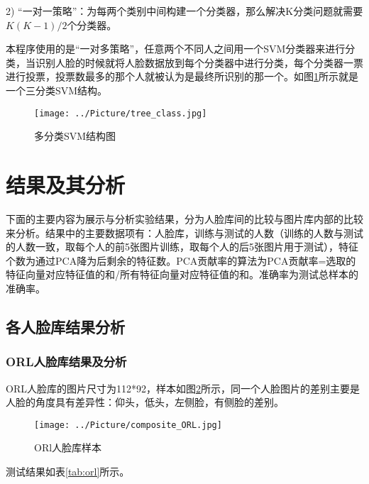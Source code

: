 \documentclass[a4paper,12pt]{ctexart}
\begin{document}
 2) “一对一策略”：为每两个类别中间构建一个分类器，那么解决K分类问题就需要$K(K-1)/2$个分类器。

 
 本程序使用的是“一对多策略”，任意两个不同人之间用一个SVM分类器来进行分类，当识别人脸的时候就将人脸数据放到每个分类器中进行分类，每个分类器一票进行投票，投票数最多的那个人就被认为是最终所识别的那一个。如图\ref{fig:msvm}所示就是一个三分类SVM结构。
 

\begin{figure}[!htb]
  \centering
  \texttt{[image: ../Picture/tree\_class.jpg]}
  \caption{多分类SVM结构图}
  \label{fig:msvm}
\end{figure}

\newpage
\section{结果及其分析}
下面的主要内容为展示与分析实验结果，分为人脸库间的比较与图片库内部的比较来分析。结果中的主要数据项有：人脸库，训练与测试的人数（训练的人数与测试的人数一致，取每个人的前5张图片训练，取每个人的后5张图片用于测试），特征个数为通过PCA降为后剩余的特征数。PCA贡献率的算法为PCA贡献率=选取的特征向量对应特征值的和/所有特征向量对应特征值的和。准确率为测试总样本的准确率。


\subsection{各人脸库结果分析}

\subsubsection{ORL人脸库结果及分析}

ORL人脸库的图片尺寸为112*92，样本如图\ref{pic:orl}所示，同一个人脸图片的差别主要是人脸的角度具有差异性：仰头，低头，左侧脸，有侧脸的差别。

\begin{figure}[ht]
  \centering
  \centerline{\texttt{[image: ../Picture/composite\_ORL.jpg]}}
  \caption{ORl人脸库样本}
\label{pic:orl}
\end{figure}


测试结果如表\ref{tab:orl}所示。
\end{document}
